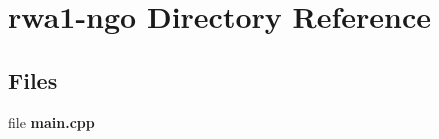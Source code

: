 \section{rwa1-\/ngo Directory Reference}
\label{dir_e8182700d3dc2d0df0a6257421261448}
\subsection*{Files}
\begin{DoxyCompactItemize}
\item 
file \textbf{ main.\+cpp}
\end{DoxyCompactItemize}
